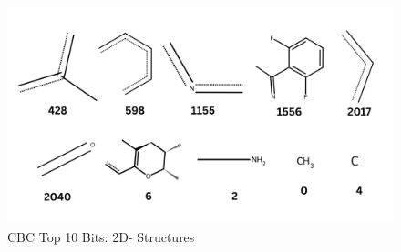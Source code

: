 \begin{figure}[htbp!] %
	\centering
	\includegraphics[scale=0.30]{top10crudebitsv2.png} %
	\caption{CBC Top 10 Bits: 2D- Structures}
	\label{fig:top10crudebits} %
\end{figure}


